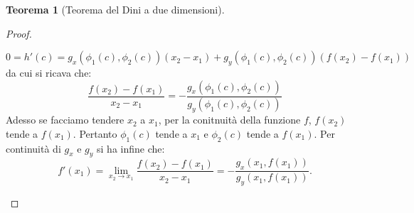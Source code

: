 \documentclass[leqno]{article}
\theoremstyle{definition}
\numberwithin{equation}{section}
\newtheorem{theorem}{Teorema}[section]
\theoremstyle{remark}
\begin{document}
\begin{theorem}[Teorema del Dini a due dimensioni]
\begin{proof}
\begin{description}
				\begin{equation}
					0=h'(c)=g_x(\phi_1(c),\phi_2(c))(x_2-x_1)+g_y(\phi_1(c),\phi_2(c))(f(x_2)-f(x_1))
				\end{equation}
				da cui si ricava che:
				\begin{equation}
					\dfrac{f(x_2)-f(x_1)}{x_2-x_1}=-\dfrac{g_x(\phi_1(c),\phi_2(c))}{g_y(\phi_1(c),\phi_2(c))}
				\end{equation}
				Adesso se facciamo tendere $x_2$ a $x_1$, per la conitnuità della funzione $f$, $f(x_2)$ tende a $f(x_1)$. Pertanto $\phi_1(c)$ tende a $x_1$ e $\phi_2(c)$ tende a $f(x_1)$. Per continuità di $g_x$ e $g_y$ si ha infine che:
				\begin{equation}
					f'(x_1)=\lim_{x_2\to x_1}\dfrac{f(x_2)-f(x_1)}{x_2-x_1}=-\dfrac{g_x(x_1,f(x_1))}{g_y(x_1,f(x_1))}.
				\end{equation}
			\end{description}
		\end{proof}
	\end{theorem}
	
\end{document}
